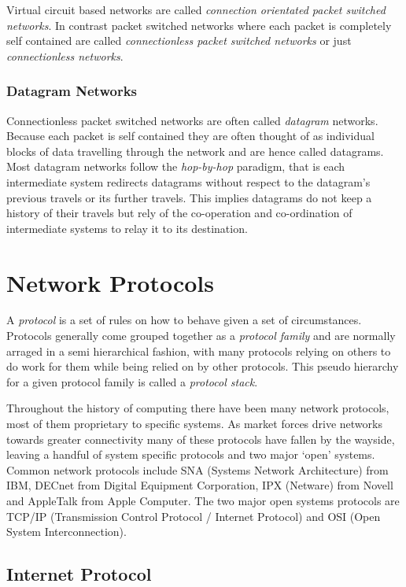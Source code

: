 Virtual circuit based networks are called {\em connection orientated
packet switched networks}.  In contrast packet switched networks where
each packet is completely self contained are called {\em
connectionless packet switched networks} or just {\em connectionless
networks}.

\subsubsection{Datagram Networks}

Connectionless packet switched networks are often called {\em
datagram} networks.  Because each packet is self contained they are
often thought of as individual blocks of data travelling through the
network and are hence called datagrams.  Most datagram networks follow
the {\em hop-by-hop} paradigm, that is each intermediate system
redirects datagrams without respect to the datagram's previous travels
or its further travels.  This implies datagrams do not keep a history
of their travels but rely of the co-operation and co-ordination of
intermediate systems to relay it to its destination.

\section{Network Protocols}

A {\em protocol} is a set of rules on how to behave given a set of
circumstances.  Protocols generally come grouped together as a {\em
protocol family} and are normally arraged in a semi hierarchical
fashion, with many protocols relying on others to do work for them
while being relied on by other protocols.  This pseudo hierarchy for a
given protocol family is called a {\em protocol stack}.

Throughout the history of computing there have been many network
protocols, most of them proprietary to specific systems.  As market
forces drive networks towards greater connectivity many of these
protocols have fallen by the wayside, leaving a handful of system
specific protocols and two major `open' systems.  Common network
protocols include SNA (Systems Network Architecture) from IBM, DECnet
from Digital Equipment Corporation, IPX (Netware) from Novell and
AppleTalk from Apple Computer.  The two major open systems protocols
are TCP/IP (Transmission Control Protocol / Internet Protocol) and OSI
(Open System Interconnection).

\subsection{Internet Protocol}

